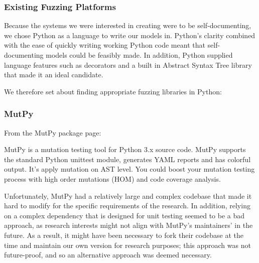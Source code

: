 \documentclass{sig-alternate}
\begin{document}

\subsubsection{Existing Fuzzing Platforms}
\label{research_fuzzing}
Because the systems we were interested in creating were to be self-documenting, we chose Python as a language to write our models in. Python's clarity combined with the ease of quickly writing working Python code meant that self-documenting models could be feasibly made. In addition, Python supplied language features such as decorators and a built in Abstract Syntax Tree library that made it an ideal candidate. \par
We therefore set about finding appropriate fuzzing libraries in Python:

\subsubsection{MutPy} 
\label{fuzzing_mutpy}
From the MutPy package page\cite{mutpy26}: 
\begin{displayquote}
MutPy is a mutation testing tool for Python 3.x source code. MutPy supports the standard Python unittest module, generates YAML reports and has colorful output. It’s apply mutation on AST level. You could boost your mutation testing process with high order mutations (HOM) and code coverage analysis.
\end{displayquote}\par

Unfortunately, MutPy had a relatively large and complex codebase\cite{khala8:online} that made it hard to modify for the specific requirements of the research. In addition, relying on a complex dependency that is designed for unit testing seemed to be a bad approach, as research interests might not align with MutPy's maintainers' in the future. As a result, it might have been necessary to fork their codebase at the time and maintain our own version for research purposes; this approach was not future-proof, and so an alternative approach was deemed necessary. \par
\end{document}
